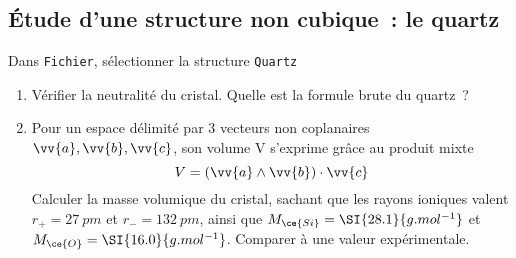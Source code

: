 \documentclass[a4paper, 10pt, final, garamond]{book}
\begin{document}
\subsection{Étude d'une structure non cubique~: le quartz}
\label{ssec:quartz}
Dans \texttt{Fichier}, sélectionner la structure \texttt{Quartz}
\begin{enumerate}[label=\sqenumi, start=32]
  \item Vérifier la neutralité du cristal. Quelle est la formule brute du
    quartz~?
  \item Pour un espace délimité par 3 vecteurs non coplanaires $\vv{a}, \vv{b},
    \vv{c}$, son volume V s'exprime grâce au produit mixte
    \[
      V = (\vv{a}\wedge \vv{b})\cdot \vv{c}
    \]
    Calculer la masse volumique du cristal, sachant que les rayons ioniques
    valent $r_{+} = \SI{27}{pm}$ et $r_{-} = \SI{132}{pm}$, ainsi que
    $M_{\ce{Si}} = \SI{28.1}{g.mol^{-1}}$ et $M_{\ce{O}} =
    \SI{16.0}{g.mol^{-1}}$. Comparer à une valeur expérimentale.
\end{enumerate}
\end{document}
